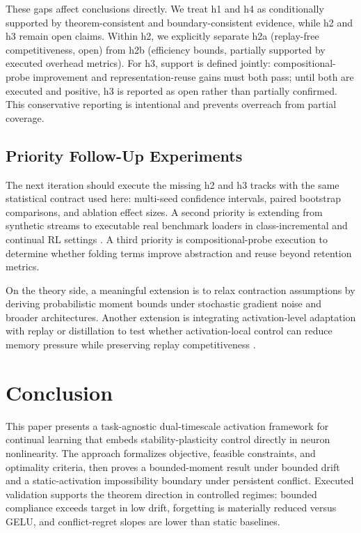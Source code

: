 \documentclass{article} %
\begin{document}
These gaps affect conclusions directly. We treat h1 and h4 as conditionally supported by theorem-consistent and boundary-consistent evidence, while h2 and h3 remain open claims. Within h2, we explicitly separate h2a (replay-free competitiveness, open) from h2b (efficiency bounds, partially supported by executed overhead metrics). For h3, support is defined jointly: compositional-probe improvement and representation-reuse gains must both pass; until both are executed and positive, h3 is reported as open rather than partially confirmed. This conservative reporting is intentional and prevents overreach from partial coverage.

\subsection{Priority Follow-Up Experiments}
The next iteration should execute the missing h2 and h3 tracks with the same statistical contract used here: multi-seed confidence intervals, paired bootstrap comparisons, and ablation effect sizes. A second priority is extending from synthetic streams to executable real benchmark loaders in class-incremental and continual RL settings \citep{s16,s28,s31,s32,s34,s35}. A third priority is compositional-probe execution to determine whether folding terms improve abstraction and reuse beyond retention metrics.

On the theory side, a meaningful extension is to relax contraction assumptions by deriving probabilistic moment bounds under stochastic gradient noise and broader architectures. Another extension is integrating activation-level adaptation with replay or distillation to test whether activation-local control can reduce memory pressure while preserving replay competitiveness \citep{s14,s36}.

\section{Conclusion}
This paper presents a task-agnostic dual-timescale activation framework for continual learning that embeds stability-plasticity control directly in neuron nonlinearity. The approach formalizes objective, feasible constraints, and optimality criteria, then proves a bounded-moment result under bounded drift and a static-activation impossibility boundary under persistent conflict. Executed validation supports the theorem direction in controlled regimes: bounded compliance exceeds target in low drift, forgetting is materially reduced versus GELU, and conflict-regret slopes are lower than static baselines.
\end{document}
